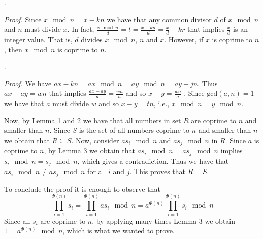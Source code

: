 .


\textit{Proof.} Since $x \mod n = x - kn$ we have that any common divisor $d$ of $x \mod n$ and $n$ must divide $x$. In fact, $\frac{x \mod n}{d} = t = \frac{x - kn}{d} = \frac{x}{d} - kr$ that implies $\frac{x}{d}$ is an integer value. That is, $d$ divides $x \mod n$, $n$ and $x$. However, if $x$ is coprime to $n$, then $x \mod n$ is coprime to $n$.

.


\textit{Proof.} We have $ax - kn = ax \mod n = ay \mod n = ay - jn$. Thus $ax - ay = wn$ that implies $\frac{ax - ay}{a} = \frac{wn}{a}$ and so $x-y = \frac{wn}{a}$ . Since $\text{gcd}(a,n)=1$ we have that $a$ must divide $w$ and so $x-y = tn$, i.e., $x \mod n = y \mod n$.



Now, by Lemma 1 and 2 we have that all numbers in set $R$ are coprime to $n$ and smaller than $n$. Since $S$ is the set of all numbers coprime to $n$ and smaller than $n$ we obtain that $R \subseteq S$. Now, consider $a s_i \mod n$ and $a s_j \mod n$ in $R$. Since $a$ is coprime to $n$, by Lemma 3 we obtain that $a s_i \mod n = a s_j \mod n$ implies $s_i \mod n = s_j \mod n$, which gives a contradiction. Thus we have that $a s_i \mod n \neq a s_j \mod n$ for all $i$ and $j$. This proves that $R = S$.

To conclude the proof it is enough to observe that $$\prod_{i=1}^{\Phi(n)}{s_i} = \prod_{i=1}^{\Phi(n)}{a s_i \mod n} = a^{\Phi(n)}\prod_{i=1}^{\Phi(n)}{s_i \mod n}$$ Since all $s_i$ are coprime to $n$, by applying many times Lemma 3 we obtain $1 = a^{\Phi(n)} \mod n$, which is what we wanted to prove.

